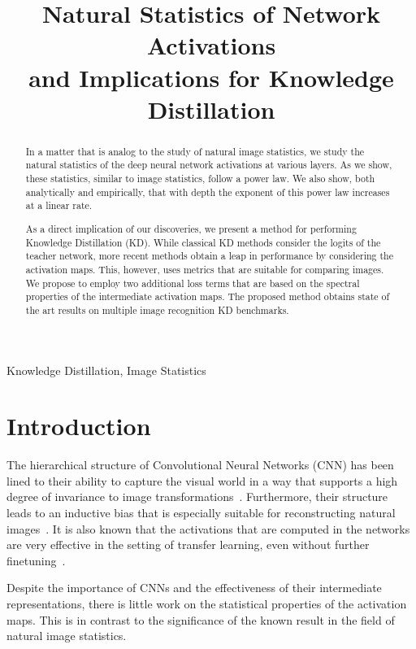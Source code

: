 \documentclass{article}
\title{Natural Statistics of Network Activations \\ and Implications for Knowledge Distillation}
\begin{document}
%
\maketitle
%
\begin{abstract}
In a matter that is analog to the study of natural image statistics, we study the natural statistics of the deep neural network activations at various layers. As we show, these statistics, similar to image statistics, follow a power law. We also show, both analytically and empirically, that with depth the exponent of this power law increases at a linear rate. 

As a direct implication of our discoveries, we present a method for performing Knowledge Distillation (KD). While classical KD methods consider the logits of the teacher network, more recent methods obtain a leap in performance by considering the activation maps. This, however, uses metrics that are suitable for comparing images. We propose to employ two additional loss terms that are based on the spectral properties of the intermediate activation maps.  The proposed method obtains state of the art results on multiple image recognition KD benchmarks. 
\end{abstract}
%
\begin{keywords}
Knowledge Distillation, Image Statistics
\end{keywords}
%


\section{Introduction}

The hierarchical structure of Convolutional Neural Networks (CNN) has been lined to their ability to capture the visual world in a way that supports a high degree of invariance to image transformations~\cite{poggio2016visual}. Furthermore, their structure leads to an inductive bias that is especially suitable for reconstructing natural images~\cite{ulyanov2018deep}. It is also known that the activations that are computed in the networks are very effective in the setting of transfer learning, even without further finetuning~\cite{yosinski2014transferable,taigman2014deepface}.

Despite the importance of CNNs and the effectiveness of their intermediate representations, there is little work on the statistical properties of the activation maps. This is in contrast to the significance of the known result in the field of natural image statistics.
\end{document}
